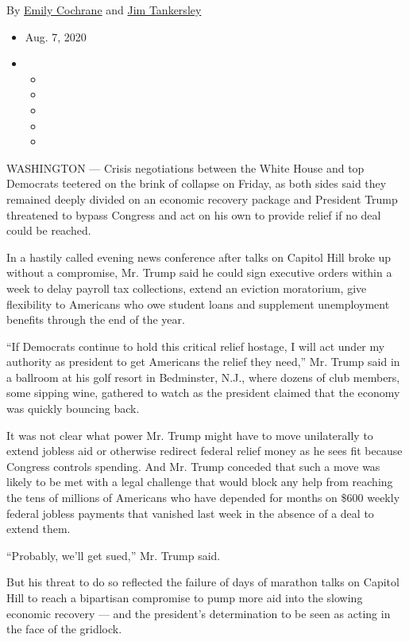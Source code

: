 By \href{https://www.nytimes.com/by/emily-cochrane}{Emily Cochrane} and
\href{https://www.nytimes.com/by/jim-tankersley}{Jim Tankersley}

\begin{itemize}
\item
  Aug. 7, 2020
\item
  \begin{itemize}
  \item
  \item
  \item
  \item
  \item
  \end{itemize}
\end{itemize}

WASHINGTON --- Crisis negotiations between the White House and top
Democrats teetered on the brink of collapse on Friday, as both sides
said they remained deeply divided on an economic recovery package and
President Trump threatened to bypass Congress and act on his own to
provide relief if no deal could be reached.

In a hastily called evening news conference after talks on Capitol Hill
broke up without a compromise, Mr. Trump said he could sign executive
orders within a week to delay payroll tax collections, extend an
eviction moratorium, give flexibility to Americans who owe student loans
and supplement unemployment benefits through the end of the year.

``If Democrats continue to hold this critical relief hostage, I will act
under my authority as president to get Americans the relief they need,''
Mr. Trump said in a ballroom at his golf resort in Bedminster, N.J.,
where dozens of club members, some sipping wine, gathered to watch as
the president claimed that the economy was quickly bouncing back.

It was not clear what power Mr. Trump might have to move unilaterally to
extend jobless aid or otherwise redirect federal relief money as he sees
fit because Congress controls spending. And Mr. Trump conceded that such
a move was likely to be met with a legal challenge that would block any
help from reaching the tens of millions of Americans who have depended
for months on \$600 weekly federal jobless payments that vanished last
week in the absence of a deal to extend them.

``Probably, we'll get sued,'' Mr. Trump said.

But his threat to do so reflected the failure of days of marathon talks
on Capitol Hill to reach a bipartisan compromise to pump more aid into
the slowing economic recovery --- and the president's determination to
be seen as acting in the face of the gridlock.

